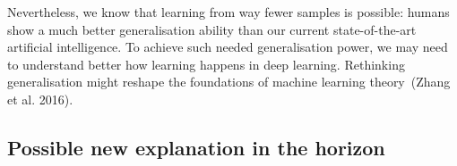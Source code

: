 \documentclass[
  letterpaper,
  12pt,
  british]{tufte-book}
\theoremstyle{plain}
\theoremstyle{plain}
\theoremstyle{definition}
\theoremstyle{remark}
\begin{document}
Nevertheless, we know that learning from way fewer samples is possible:
humans show a much better generalisation ability than our current
state-of-the-art artificial intelligence. To achieve such needed
generalisation power, we may need to understand better how learning
happens in deep learning. Rethinking generalisation might reshape the
foundations of machine learning theory~(Zhang et al.
2016).

\hypertarget{possible-new-explanation-in-the-horizon}{%
\subsection{Possible new explanation in the
horizon}\label{possible-new-explanation-in-the-horizon}}
\end{document}
